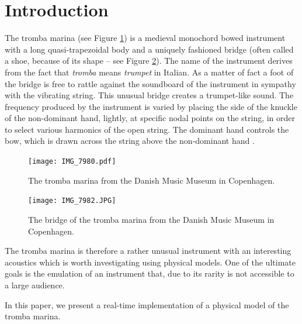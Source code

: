 \documentclass[dvipsnames, pdftex]{article}
\title{\papertitle}
\def\SBcomment[#1]{\textcolor{Red}{#1}}
\def\MDcomment[#1]{\textcolor{Blue}{#1}}
\def\SScomment[#1]{\textcolor{OliveGreen}{#1}}
\begin{document}
%
\capstartfalse
\maketitle
\capstarttrue
%
\begin{abstract}
You can place comments in colour if you want :) Like \SBcomment[this (Stefan)], \MDcomment[this (Michele)] or \SScomment[this (Stefania)].
\end{abstract}
%

\section{Introduction}\label{sec:introduction}
The tromba marina (see Figure 
 \ref{fig:tromba}) is a medieval monochord bowed instrument with a long quasi-trapezoidal body and a uniquely fashioned bridge (often called a shoe, because of its shape – see Figure \ref{fig:bridge}). 
 The name of the instrument derives from the fact that {\em tromba} means {\em trumpet} in Italian. As a matter of fact
 a foot of the bridge is free to rattle against the soundboard of the instrument in sympathy with the vibrating string. 
 This unusual bridge creates a trumpet-like sound.
 The frequency produced by the instrument is varied by placing the side of the knuckle of the non-dominant hand, lightly, at specific nodal points on the string, in order to select various harmonics of the open string. The dominant hand controls the bow, which is drawn across the string above the non-dominant hand \cite{munrow1976instruments}.
 
 
 
  
   \begin{figure}
  \centering
  \texttt{[image: IMG\_7980.pdf]}
  \caption{The tromba marina from the Danish Music Museum in Copenhagen. }
  \label{fig:tromba}
\end{figure}

   \begin{figure}
  \centering
  \texttt{[image: IMG\_7982.JPG]}
  \caption{The bridge of the tromba marina from the Danish Music Museum in Copenhagen. }
  \label{fig:bridge}
\end{figure}

The tromba marina is therefore a rather unusual instrument with an interesting acoustics which is worth investigating using  physical models. 
One of the ultimate goals is the emulation of an instrument that, due to its rarity is not accessible to a large audience.

In this paper, we present a real-time implementation of a physical model of the tromba marina.
\end{document}
